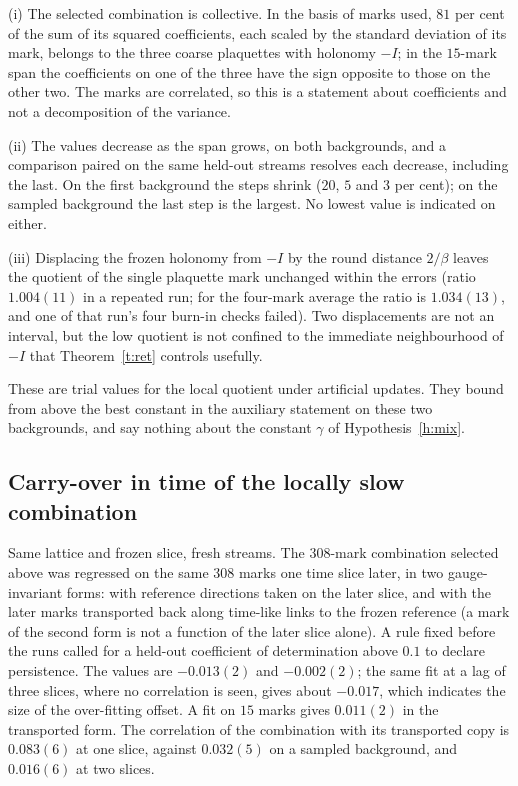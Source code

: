(i) The selected combination is collective. In the basis of marks used, $81$ per cent of the sum of its
squared coefficients, each scaled by the standard deviation of its mark, belongs to the three coarse
plaquettes with holonomy $-I$; in the $15$-mark span the coefficients on one of the three have the sign
opposite to those on the other two. The marks are correlated, so
this is a statement about coefficients and not a decomposition of the variance.

(ii) The values decrease as the span grows, on both backgrounds, and a comparison paired on the same held-out
streams resolves each decrease, including the last. On the first background the steps shrink ($20$, $5$ and
$3$ per cent); on the sampled background the last step is the largest. No lowest value is indicated on
either.

(iii) Displacing the frozen holonomy from $-I$ by the round distance $2/\beta$ leaves the quotient of the
single plaquette mark unchanged within the errors (ratio $1.004(11)$ in a repeated run; for the four-mark
average the ratio is $1.034(13)$, and one of that run's four burn-in checks failed). Two displacements are
not an interval, but the low quotient is not confined to the immediate neighbourhood of $-I$ that
Theorem~\ref{t:ret} controls usefully.

These are trial values for the local quotient under artificial updates. They bound from above the best
constant in the auxiliary statement on these two backgrounds, and say nothing about the constant $\gamma$ of
Hypothesis~\ref{h:mix}.

\subsection{Carry-over in time of the locally slow combination}\label{s:time}
Same lattice and frozen slice, fresh streams. The $308$-mark combination selected above was regressed on the
same $308$ marks one time slice later, in two gauge-invariant forms: with reference directions taken on the
later slice, and with the later marks transported back along time-like links to the frozen reference (a mark
of the second form is not a function of the later slice alone). A rule fixed before the runs called for a
held-out coefficient of determination above $0.1$ to declare persistence. The values are $-0.013(2)$ and
$-0.002(2)$; the same fit at a lag of three slices, where no correlation is seen, gives about $-0.017$, which
indicates the size of the over-fitting offset. A fit on $15$ marks gives $0.011(2)$ in the transported form.
The correlation of the combination with its transported copy is $0.083(6)$ at one slice, against $0.032(5)$ on
a sampled background, and $0.016(6)$ at two slices.

